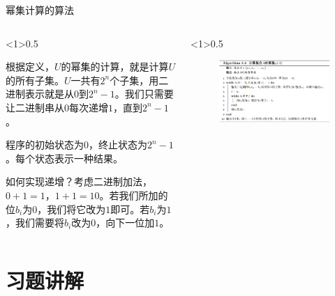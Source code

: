 \documentclass[xetex,10pt,aspectratio=43]{beamer}
\begin{document}
	\begin{frame}[fragile]{幂集计算的算法}
			
		\begin{columns}
			
			\begin{column}<1>{0.5\textwidth}
			
			根据定义，$U$的幂集的计算，就是计算$U$的所有子集。$U$一共有$2^n$个子集，用二进制表示就是从$0$到$2^n-1$。我们只需要让二进制串从$0$每次递增$1$，直到$2^n-1$。
			
			程序的初始状态为$0$，终止状态为$2^n-1$。每个状态表示一种结果。
			
			如何实现递增？考虑二进制加法，$0+1=1$，$1+1=10$。若我们所加的位$b_i$为$0$，我们将它改为$1$即可。若$b_i$为$1$，我们需要将$b_i$改为$0$，向下一位加$1$。
			
			\end{column}
			
			\begin{column}<1>{0.5\textwidth}
				
				\begin{figure}
				
					\centering
					
					\includegraphics[scale=0.3]{01.png}
					
				\end{figure}	
					
			\end{column}
			
		\end{columns}

	\end{frame}

	\section{习题讲解}
	
\end{document}
